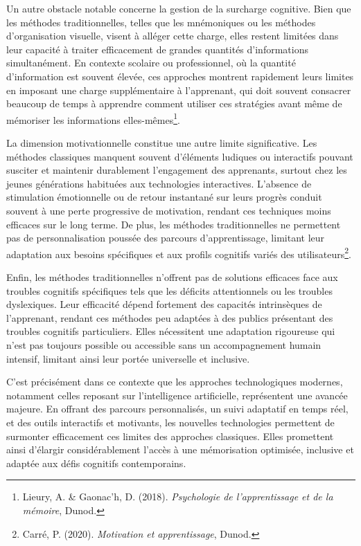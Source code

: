 \documentclass[12pt,a4paper]{report}
\begin{document}
Un autre obstacle notable concerne la gestion de la surcharge cognitive. Bien que les méthodes traditionnelles, telles que les mnémoniques ou les méthodes d’organisation visuelle, visent à alléger cette charge, elles restent limitées dans leur capacité à traiter efficacement de grandes quantités d'informations simultanément. En contexte scolaire ou professionnel, où la quantité d’information est souvent élevée, ces approches montrent rapidement leurs limites en imposant une charge supplémentaire à l'apprenant, qui doit souvent consacrer beaucoup de temps à apprendre comment utiliser ces stratégies avant même de mémoriser les informations elles-mêmes\footnote{Lieury, A. \& Gaonac’h, D. (2018). \textit{Psychologie de l’apprentissage et de la mémoire}, Dunod.}.

La dimension motivationnelle constitue une autre limite significative. Les méthodes classiques manquent souvent d'éléments ludiques ou interactifs pouvant susciter et maintenir durablement l’engagement des apprenants, surtout chez les jeunes générations habituées aux technologies interactives. L’absence de stimulation émotionnelle ou de retour instantané sur leurs progrès conduit souvent à une perte progressive de motivation, rendant ces techniques moins efficaces sur le long terme. De plus, les méthodes traditionnelles ne permettent pas de personnalisation poussée des parcours d’apprentissage, limitant leur adaptation aux besoins spécifiques et aux profils cognitifs variés des utilisateurs\footnote{Carré, P. (2020). \textit{Motivation et apprentissage}, Dunod.}.

Enfin, les méthodes traditionnelles n’offrent pas de solutions efficaces face aux troubles cognitifs spécifiques tels que les déficits attentionnels ou les troubles dyslexiques. Leur efficacité dépend fortement des capacités intrinsèques de l'apprenant, rendant ces méthodes peu adaptées à des publics présentant des troubles cognitifs particuliers. Elles nécessitent une adaptation rigoureuse qui n’est pas toujours possible ou accessible sans un accompagnement humain intensif, limitant ainsi leur portée universelle et inclusive.

C’est précisément dans ce contexte que les approches technologiques modernes, notamment celles reposant sur l’intelligence artificielle, représentent une avancée majeure. En offrant des parcours personnalisés, un suivi adaptatif en temps réel, et des outils interactifs et motivants, les nouvelles technologies permettent de surmonter efficacement ces limites des approches classiques. Elles promettent ainsi d’élargir considérablement l’accès à une mémorisation optimisée, inclusive et adaptée aux défis cognitifs contemporains.
\end{document}
